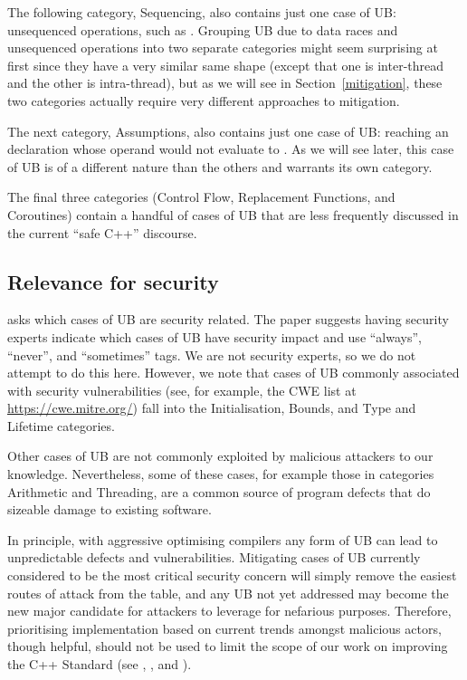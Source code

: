 The following category, Sequencing, also contains just one case of UB: unsequenced operations, such as \mbox{}. Grouping UB due to data races and unsequenced operations into two separate categories might seem surprising at first since they have a very similar same shape (except that one is inter-thread and the other is intra-thread), but as we will see in Section~\ref{mitigation}, these two categories actually require very different approaches to mitigation.

The next category, Assumptions, also contains just one case of UB: reaching an \tcode{[[assume]]} declaration whose operand would not evaluate to . As we will see later, this case of UB is of a different nature than the others and warrants its own category.

The final three categories (Control Flow, Replacement Functions, and Coroutines) contain a handful of cases of UB that are less frequently discussed in the current ``safe C++'' discourse.

\subsection{Relevance for security}

\cite{P3656R1} asks which cases of UB are security related. The paper suggests having security experts indicate which cases of UB have security impact and use ``always'', ``never'', and ``sometimes'' tags. We are not security experts, so we do not attempt to do this here. However, we note that cases of UB commonly associated with security vulnerabilities (see, for example, the CWE list at \url{https://cwe.mitre.org/}) fall into the Initialisation, Bounds, and Type and Lifetime categories. 

Other cases of UB are not commonly exploited by malicious attackers to our knowledge. Nevertheless, some of these cases, for example those in categories Arithmetic and Threading, are a common source of program defects that do sizeable damage to existing software.

In principle, with aggressive optimising compilers any form of UB can lead to unpredictable defects and vulnerabilities. Mitigating cases of UB currently considered to be the most critical security concern will simply remove the easiest routes of attack from the table, and any UB not yet addressed may become the new major candidate for attackers to leverage for nefarious purposes.  Therefore, prioritising implementation based on current trends amongst malicious actors, though helpful, should not be used to limit the scope of our work on improving the C++ Standard (see \cite{Sutter2024}, \cite{P3500R1}, and \cite{P3578R0}).

